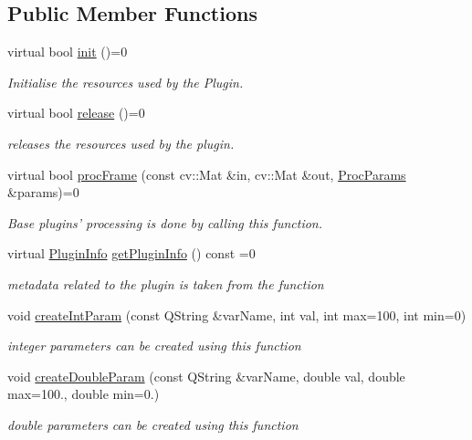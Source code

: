 \subsection*{Public Member Functions}
\begin{DoxyCompactItemize}
\item 
virtual bool \hyperlink{class_nooba_plugin_a_p_i_a213d0b72183f3266397529925fe57466}{init} ()=0
\begin{DoxyCompactList}\small\item\em Initialise the resources used by the Plugin. \end{DoxyCompactList}\item 
virtual bool \hyperlink{class_nooba_plugin_a_p_i_a2b0532499d63ed3f29ab9ab5bf4caebe}{release} ()=0
\begin{DoxyCompactList}\small\item\em releases the resources used by the plugin. \end{DoxyCompactList}\item 
virtual bool \hyperlink{class_nooba_plugin_a_p_i_ac3878e3576fcc7ca5fbcc111355d2a49}{proc\-Frame} (const cv\-::\-Mat \&in, cv\-::\-Mat \&out, \hyperlink{class_proc_params}{Proc\-Params} \&params)=0
\begin{DoxyCompactList}\small\item\em Base plugins' processing is done by calling this function. \end{DoxyCompactList}\item 
virtual \hyperlink{class_plugin_info}{Plugin\-Info} \hyperlink{class_nooba_plugin_a_p_i_a1d616b65830b222f8ffa4ed374ae6f15}{get\-Plugin\-Info} () const =0
\begin{DoxyCompactList}\small\item\em metadata related to the plugin is taken from the function \end{DoxyCompactList}\item 
void \hyperlink{class_nooba_plugin_a_p_i_ab01db814b095792dd5eff8d91804b50b}{create\-Int\-Param} (const Q\-String \&var\-Name, int val, int max=100, int min=0)
\begin{DoxyCompactList}\small\item\em integer parameters can be created using this function \end{DoxyCompactList}\item 
void \hyperlink{class_nooba_plugin_a_p_i_ae0d8554682787f936739b33e9e4c1191}{create\-Double\-Param} (const Q\-String \&var\-Name, double val, double max=100., double min=0.)
\begin{DoxyCompactList}\small\item\em double parameters can be created using this function \end{DoxyCompactList}\item 

\end{DoxyCompactItemize}
